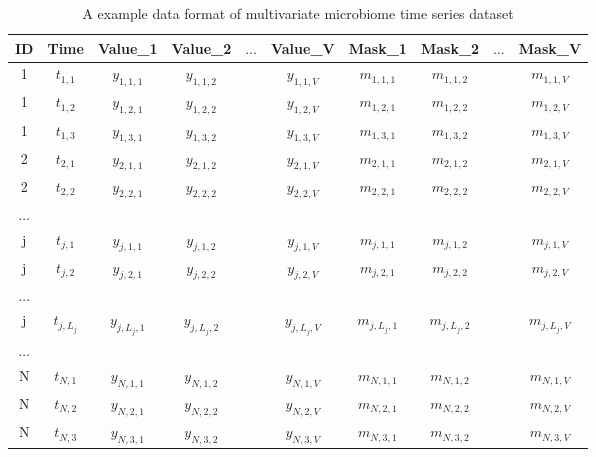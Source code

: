 \documentclass[a4 paper]{article}
\begin{document}
\begin{table}[h!]
  \centering
  \caption{A example data format of multivariate microbiome time series dataset}
    \begin{tabular}{c|c|c|c|c|c|c|c|c|c}
    ID    & Time  & Value\_1 & Value\_2 & {$\ldots$} & Value\_V & Mask\_1 & Mask\_2 & {$\ldots$} & Mask\_V \\ \midrule
    {1} & $t_{1,1}$ & $y_{1,1,1}$ & $y_{1,1,2}$ &       & $y_{1,1,V}$ & $m_{1,1,1}$ & $m_{1,1,2}$ &       & $m_{1,1,V}$ \\ \hline
    {1} & $t_{1,2}$ & $y_{1,2,1}$ & $y_{1,2,2}$ &       & $y_{1,2,V}$ & $m_{1,2,1}$ & $m_{1,2,2}$ &       & $m_{1,2,V}$ \\ \hline
    {1} & $t_{1,3}$ & $y_{1,3,1}$ & $y_{1,3,2}$ &       & $y_{1,3,V}$ & $m_{1,3,1}$ & $m_{1,3,2}$ &       & $m_{1,3,V}$ \\ \hline
    {2} & $t_{2,1}$ & $y_{2,1,1}$ & $y_{2,1,2}$ &       & $y_{2,1,V}$ & $m_{2,1,1}$ & $m_{2,1,2}$ &       & $m_{2,1,V}$ \\ \hline
    {2} & $t_{2,2}$ & $y_{2,2,1}$ & $y_{2,2,2}$ &       & $y_{2,2,V}$ & $m_{2,2,1}$ & $m_{2,2,2}$ &       & $m_{2,2,V}$ \\ \hline
    $\ldots$ &       &       &       &       &       &       &       &       &  \\ \hline
    j     & $t_{j,1}$ & $y_{j,1,1}$ & $y_{j,1,2}$ &       & $y_{j,1,V}$ & $m_{j,1,1}$ & $m_{j,1,2}$ &       & $m_{j,1,V}$ \\ \hline
    j     & $t_{j,2}$ & $y_{j,2,1}$ & $y_{j,2,2}$ &       & $y_{j,2,V}$ & $m_{j,2,1}$ & $m_{j,2,2}$ &       & $m_{j,2,V}$ \\ \hline
    $\ldots$ &       &       &       &       &       &       &       &       &  \\ \hline
    j     & $t_{j,L_j}$ & $y_{j,L_j,1}$ & $y_{j,L_j,2}$ &       & $y_{j,L_j,V}$ & $m_{j,L_j,1}$ & $m_{j,L_j,2}$ &       & $m_{j,L_j,V}$ \\ \hline
    $\ldots$ &       &       &       &       &       &       &       &       &  \\ \hline
    N     & $t_{N,1}$ & $y_{N,1,1}$ & $y_{N,1,2}$ &       & $y_{N,1,V}$ & $m_{N,1,1}$ & $m_{N,1,2}$ &       & $m_{N,1,V}$ \\ \hline
    N     & $t_{N,2}$ & $y_{N,2,1}$ & $y_{N,2,2}$ &       & $y_{N,2,V}$ & $m_{N,2,1}$ & $m_{N,2,2}$ &       & $m_{N,2,V}$ \\ \hline
    N     & $t_{N,3}$ & $y_{N,3,1}$ & $y_{N,3,2}$ &       & $y_{N,3,V}$ & $m_{N,3,1}$ & $m_{N,3,2}$ &       & $m_{N,3,V}$ \\ 
    \end{tabular}
\label{input_format}
\end{table}
\end{document}
